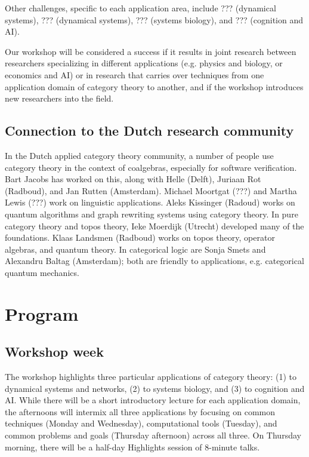 \documentclass{article}
\newcommand{\redout}[1]{{\color{red}#1}}
\begin{document}
Other challenges, specific to each application area, include \redout{???} (dynamical systems), \redout{???} (dynamical systems), \redout{???} (systems biology), and \redout{???} (cognition and AI).

Our workshop will be considered a success if it results in joint research between researchers specializing in different applications (e.g. physics and biology, or economics and AI) or in research that carries over techniques from one application domain of category theory to another, and if the workshop introduces new researchers into the field.

\subsection{Connection to the Dutch research community}
\redout{In the Dutch applied category theory community, a number of people use category theory  in the context of coalgebras, especially for software verification. Bart Jacobs has worked on this, along with Helle (Delft), Juriaan Rot (Radboud), and Jan Rutten (Amsterdam). Michael Moortgat (???) and Martha Lewis (???) work on linguistic applications. Aleks Kissinger (Radoud) works on quantum algorithms and graph rewriting systems using category theory. In pure category theory and topos theory, Ieke Moerdijk (Utrecht) developed many of the foundations. Klaas Landsmen (Radboud) works on topos theory, operator algebras, and quantum theory. In categorical logic are Sonja Smets and Alexandru Baltag (Amsterdam); both are friendly to applications, e.g. categorical quantum mechanics.}

\section{Program}
\subsection{Workshop week}
The workshop highlights three particular applications of category theory: (1) to dynamical systems and networks, (2) to systems biology, and (3) to cognition and AI. While there will be a short introductory lecture for each application domain, the afternoons will intermix all three applications by focusing on common techniques (Monday and Wednesday), computational tools (Tuesday), and common problems and goals (Thursday afternoon) across all three. On Thursday morning, there will be a half-day Highlights session of 8-minute talks.
\end{document}
